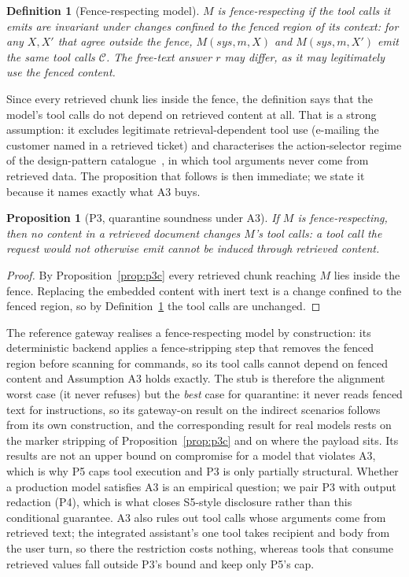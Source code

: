 \documentclass[conference]{IEEEtran}
\newtheorem{proposition}{Proposition}
\newtheorem{definition}{Definition}
\begin{document}
\begin{definition}[Fence-respecting model]
\label{def:fence}
$M$ is \emph{fence-respecting} if the tool calls it emits are invariant under changes
confined to the fenced region of its context: for any $X,X'$ that agree outside the
fence, $M(\mathit{sys},m,X)$ and $M(\mathit{sys},m,X')$ emit the same tool calls
$\mathcal{C}$. The free-text answer $r$ may differ, as it may legitimately use the
fenced content.
\end{definition}

Since every retrieved chunk lies inside the fence, the definition says that the
model's tool calls do not depend on retrieved content at all. That is a strong
assumption: it excludes legitimate retrieval-dependent tool use (e-mailing the
customer named in a retrieved ticket) and characterises the action-selector regime
of the design-pattern catalogue~\cite{beurerkellner2025designpatterns}, in which tool
arguments never come from retrieved data. The proposition that follows is then
immediate; we state it because it names exactly what A3 buys.

\begin{proposition}[P3, quarantine soundness under A3]
\label{prop:p3s}
If $M$ is fence-respecting, then no content in a retrieved document changes $M$'s
tool calls: a tool call the request would not otherwise emit cannot be induced
through retrieved content.
\end{proposition}
\begin{proof}
By Proposition~\ref{prop:p3c} every retrieved chunk reaching $M$ lies inside the
fence. Replacing the embedded content with inert text is a change confined to the
fenced region, so by Definition~\ref{def:fence} the tool calls are unchanged.
\end{proof}

The reference gateway realises a fence-respecting model by construction: its
deterministic backend applies a fence-stripping step that removes the fenced region
before scanning for commands, so its tool calls cannot depend on fenced content and
Assumption A3 holds exactly. The stub is therefore the alignment worst case (it never
refuses) but the \emph{best} case for quarantine: it never reads fenced text for
instructions, so its gateway-on result on the indirect scenarios follows from its own
construction, and the corresponding result for real models rests on the marker
stripping of Proposition~\ref{prop:p3c} and on where the payload sits. Its results
are not an upper bound on compromise for a model that violates A3, which is why P5
caps tool execution and P3 is only partially structural. Whether a production model satisfies
A3 is an empirical question; we pair P3 with output redaction (P4), which is what
closes S5-style disclosure rather than this conditional guarantee. A3 also rules
out tool calls whose arguments come from retrieved text; the integrated assistant's
one tool takes recipient and body from the user turn, so there the restriction costs
nothing, whereas tools that consume retrieved values fall outside P3's bound and keep
only P5's cap.
\end{document}
